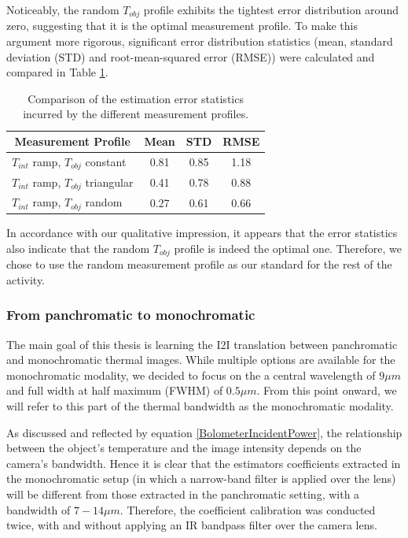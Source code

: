 Noticeably, the random $T_\mathit{obj}$ profile exhibits the tightest error distribution around zero, suggesting that it is the optimal measurement profile.
To make this argument more rigorous, significant error distribution statistics (mean, standard deviation (STD) and root-mean-squared error (RMSE)) were calculated and compared in Table \ref{tbl:meas_prof_err_stat}.
\begin{table}[H]
  \centering
  \begin{tabular}{| l || c c c |}
      \hline
      \multicolumn{1}{|c||}{Measurement Profile} & Mean & STD & RMSE\\
      \hline
      $T_\mathit{int}$ ramp, $T_\mathit{obj}$ constant    & 0.81 & 0.85 & 1.18\\ 
      \hline
      $T_\mathit{int}$ ramp, $T_\mathit{obj}$ triangular  & 0.41 & 0.78 & 0.88\\ 
      \hline
      $T_\mathit{int}$ ramp, $T_\mathit{obj}$ random      & 0.27 & 0.61 & 0.66\\ 
      \hline
  \end{tabular}
  \caption{Comparison of the estimation error statistics incurred by the different measurement profiles.}
  \label{tbl:meas_prof_err_stat}
\end{table}
In accordance with our qualitative impression, it appears that the error statistics also indicate that the random $T_\mathit{obj}$ profile is indeed the optimal one.
Therefore, we chose to use the random measurement profile as our standard for the rest of the activity.

\subsubsection{From panchromatic to monochromatic}
The main goal of this thesis is learning the I2I translation between panchromatic and monochromatic thermal images.
While multiple options are available for the monochromatic modality, we decided to focus on the a central wavelength of $9\mu m$ and full width at half maximum (FWHM) of $0.5 \mu m$.
From this point onward, we will refer to this part of the thermal bandwidth as the monochromatic modality.

As discussed and reflected by equation \ref{BolometerIncidentPower}, the relationship between the object's temperature and the image intensity depends on the camera's bandwidth.
Hence it is clear that the estimators coefficients extracted in the monochromatic setup (in which a narrow-band filter is applied over the lens) will be different from those extracted in the panchromatic setting, with a bandwidth of $7-14 \mu m$.
Therefore, the coefficient calibration was conducted twice, with and without applying an IR bandpass filter over the camera lens.

